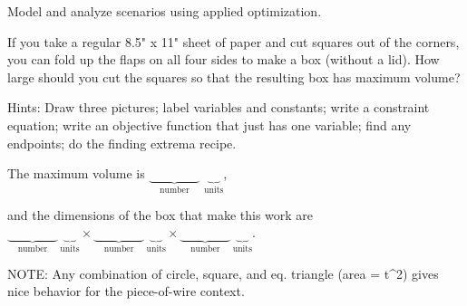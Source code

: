 Model and analyze scenarios using applied optimization.

\hrulefill

If you take a regular 8.5" x 11" sheet of paper and cut squares out of the corners, you can fold up the flaps on all four sides to make a box (without a lid). How large should you cut the squares so that the resulting box has maximum volume?

{\tiny Hints: Draw three pictures; label variables and constants; write a constraint equation; write an objective function that just has one variable; find any endpoints; do the finding extrema recipe.}

\vfill

The maximum volume is $\underbrace{\qquad\qquad}_{\text{number}}$ $\underbrace{\quad}_{\text{units}}$, 

and the dimensions of the box that make this work are 
$\underbrace{\qquad\qquad}_{\text{number}}\, 
\underbrace{\quad}_{\text{units}}
\times 
\underbrace{\qquad\qquad}_{\text{number}}\,
\underbrace{\quad}_{\text{units}}
\times
\underbrace{\qquad\qquad}_{\text{number}}\,
\underbrace{\quad}_{\text{units}}$.



NOTE: Any combination of circle, square, and eq. triangle (area = t^2) gives nice behavior for the piece-of-wire context.